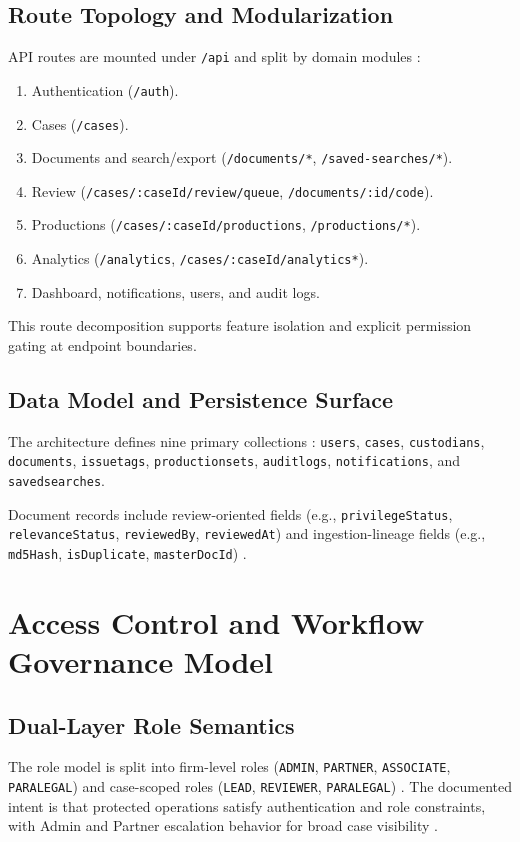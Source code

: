 \documentclass[conference]{IEEEtran}
\begin{document}
\subsection{Route Topology and Modularization}
API routes are mounted under \texttt{/api} and split by domain modules \cite{arch,api}:
\begin{enumerate}
\item Authentication (\texttt{/auth}).
\item Cases (\texttt{/cases}).
\item Documents and search/export (\texttt{/documents/*}, \texttt{/saved-searches/*}).
\item Review (\texttt{/cases/:caseId/review/queue}, \texttt{/documents/:id/code}).
\item Productions (\texttt{/cases/:caseId/productions}, \texttt{/productions/*}).
\item Analytics (\texttt{/analytics}, \texttt{/cases/:caseId/analytics*}).
\item Dashboard, notifications, users, and audit logs.
\end{enumerate}

This route decomposition supports feature isolation and explicit permission gating at endpoint boundaries.

\subsection{Data Model and Persistence Surface}
The architecture defines nine primary collections \cite{arch}: \texttt{users}, \texttt{cases}, \texttt{custodians}, \texttt{documents}, \texttt{issuetags}, \texttt{productionsets}, \texttt{auditlogs}, \texttt{notifications}, and \texttt{savedsearches}.

Document records include review-oriented fields (e.g., \texttt{privilegeStatus}, \texttt{relevanceStatus}, \texttt{reviewedBy}, \texttt{reviewedAt}) and ingestion-lineage fields (e.g., \texttt{md5Hash}, \texttt{isDuplicate}, \texttt{masterDocId}) \cite{arch,api}.

\section{Access Control and Workflow Governance Model}
\subsection{Dual-Layer Role Semantics}
The role model is split into firm-level roles (\texttt{ADMIN}, \texttt{PARTNER}, \texttt{ASSOCIATE}, \texttt{PARALEGAL}) and case-scoped roles (\texttt{LEAD}, \texttt{REVIEWER}, \texttt{PARALEGAL}) \cite{roles}. The documented intent is that protected operations satisfy authentication and role constraints, with Admin and Partner escalation behavior for broad case visibility \cite{roles}.
\end{document}
